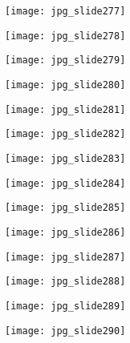 \documentclass[main.tex]{subfiles}
\begin{document}
\begin{center}
\texttt{[image: jpg\_slide277]}
\end{center}

\begin{center}
\texttt{[image: jpg\_slide278]}
\end{center}

\begin{center}
\texttt{[image: jpg\_slide279]}
\end{center}

\begin{center}
\texttt{[image: jpg\_slide280]}
\end{center}

\begin{center}
\texttt{[image: jpg\_slide281]}
\end{center}

\begin{center}
\texttt{[image: jpg\_slide282]}
\end{center}

\begin{center}
\texttt{[image: jpg\_slide283]}
\end{center}

\begin{center}
\texttt{[image: jpg\_slide284]}
\end{center}

\begin{center}
\texttt{[image: jpg\_slide285]}
\end{center}

\begin{center}
\texttt{[image: jpg\_slide286]}
\end{center}

\begin{center}
\texttt{[image: jpg\_slide287]}
\end{center}

\begin{center}
\texttt{[image: jpg\_slide288]}
\end{center}

\begin{center}
\texttt{[image: jpg\_slide289]}
\end{center}

\begin{center}
\texttt{[image: jpg\_slide290]}
\end{center}
\end{document}
